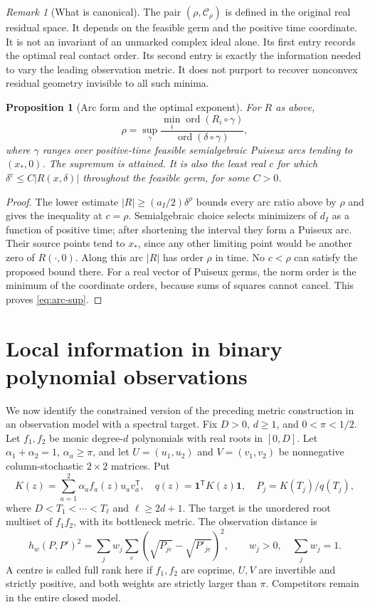 \documentclass[11pt,reqno]{amsart}
\numberwithin{equation}{section}
\newtheorem{proposition}[theorem]{Proposition}
\theoremstyle{definition}
\theoremstyle{remark}
\newtheorem{remark}[theorem]{Remark}
\newcommand{\ord}{\operatorname{ord}}
\newcommand{\one}{\mathbf 1}
\newcommand{\cC}{\mathcal C}
\begin{document}
\begin{remark}[What is canonical]\label{rem:canonical}
The pair $(\rho,\cC_\rho)$ is defined in the original real residual space. It depends on the feasible germ and the positive time coordinate. It is not an invariant of an unmarked complex ideal alone. Its first entry records the optimal real contact order. Its second entry is exactly the information needed to vary the leading observation metric. It does not purport to recover nonconvex residual geometry invisible to all such minima.
\end{remark}

\begin{proposition}[Arc form and the optimal exponent]\label{prop:arcs}
For $R$ as above,
\begin{equation}\label{eq:arc-sup}
 \rho=\sup_\gamma
  \frac{\min_i\ord(R_i\circ\gamma)}{\ord(\delta\circ\gamma)},
\end{equation}
where $\gamma$ ranges over positive-time feasible semialgebraic Puiseux arcs tending to $(x_*,0)$. The supremum is attained. It is also the least real $c$ for which $\delta^c\le C|R(x,\delta)|$ throughout the feasible germ, for some $C>0$.
\end{proposition}
\begin{proof}
The lower estimate $|R|\ge(a_I/2)\delta^\rho$ bounds every arc ratio above by $\rho$ and gives the inequality at $c=\rho$. Semialgebraic choice selects minimizers of $d_I$ as a function of positive time; after shortening the interval they form a Puiseux arc. Their source points tend to $x_*$, since any other limiting point would be another zero of $R(\cdot,0)$. Along this arc $|R|$ has order $\rho$ in time. No $c<\rho$ can satisfy the proposed bound there. For a real vector of Puiseux germs, the norm order is the minimum of the coordinate orders, because sums of squares cannot cancel. This proves \eqref{eq:arc-sup}.
\end{proof}

\section{Local information in binary polynomial observations}\label{sec:local}
We now identify the constrained version of the preceding metric construction in an observation model with a spectral target. Fix $D>0$, $d\ge1$, and $0<\pi<1/2$. Let $f_1,f_2$ be monic degree-$d$ polynomials with real roots in $[0,D]$. Let $\alpha_1+\alpha_2=1$, $\alpha_a\ge\pi$, and let $U=(u_1,u_2)$ and $V=(v_1,v_2)$ be nonnegative column-stochastic $2\times2$ matrices. Put
\begin{equation}\label{eq:binary}
 K(z)=\sum_{a=1}^2\alpha_a f_a(z)u_av_a^{\mathsf T},\quad
 q(z)=\one^{\mathsf T}K(z)\one,\quad P_j=K(T_j)/q(T_j),
\end{equation}
where $D<T_1<\cdots<T_\ell$ and $\ell\ge2d+1$. The target is the unordered root multiset of $f_1f_2$, with its bottleneck metric. The observation distance is
\[
 h_w(P,P')^2=\sum_jw_j\sum_e(\sqrt{P_{je}}-\sqrt{P'_{je}})^2,
 \qquad w_j>0,\quad\sum_jw_j=1.
\]
A centre is called full rank here if $f_1,f_2$ are coprime, $U,V$ are invertible and strictly positive, and both weights are strictly larger than $\pi$. Competitors remain in the entire closed model.
\end{document}
